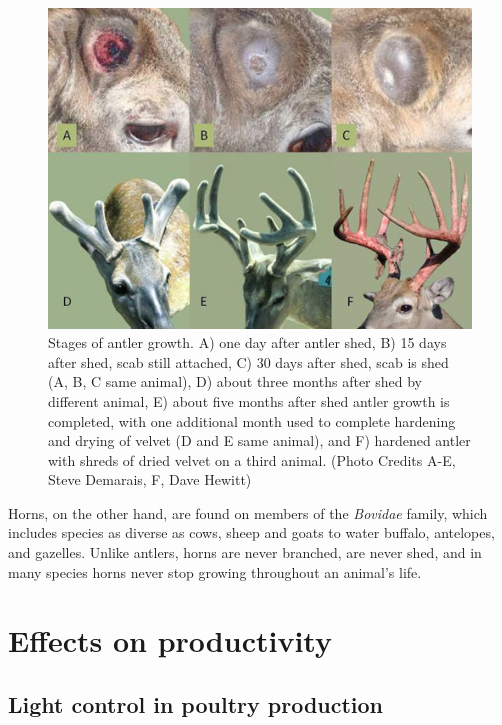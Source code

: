 \documentclass[]{book}
\begin{document}
\begin{figure}

{\centering \includegraphics[width=1\linewidth]{figures/antler-stages} 

}

\caption{Stages of antler growth. A) one day after antler shed, B) 15 days after shed, scab still attached, C) 30 days after shed, scab is shed (A, B, C same animal), D) about three months after shed by different animal, E) about five months after shed antler growth is completed, with one additional month used to complete hardening and drying of velvet (D and E same animal), and F) hardened antler with shreds of dried velvet on a third animal. (Photo Credits A-E, Steve Demarais, F, Dave Hewitt)}\label{fig:antler-stage}
\end{figure}

Horns, on the other hand, are found on members of the \emph{Bovidae}
family, which includes species as diverse as cows, sheep and goats to
water buffalo, antelopes, and gazelles. Unlike antlers, horns are never
branched, are never shed, and in many species horns never stop growing
throughout an animal's life.

\section{Effects on productivity}\label{effects-on-productivity}

\subsection{Light control in poultry
production}\label{light-control-in-poultry-production}
\end{document}
